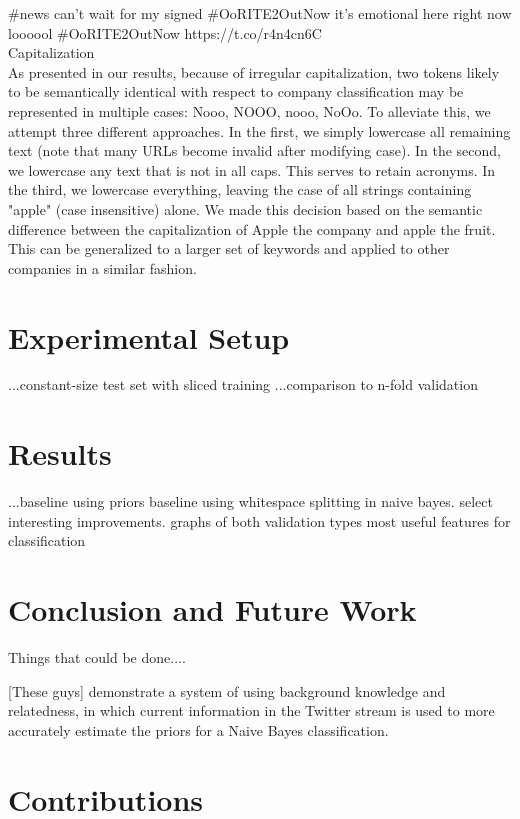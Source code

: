 \documentclass[letterpaper]{article}
\begin{document}
#news can't wait for my signed #OoRITE2OutNow it's emotional here right now loooool #OoRITE2OutNow https://t.co/r4n4cn6C \\

Capitalization\\
As presented in our results, because of irregular capitalization, two tokens likely to be semantically identical with respect to company classification may be represented in multiple cases: {Nooo, NOOO, nooo, NoOo}. To alleviate this, we attempt three different approaches. In the first, we simply lowercase all remaining text (note that many URLs become invalid after modifying case). In the second, we lowercase any text that is not in all caps. This serves to retain acronyms. In the third, we lowercase everything, leaving the case of all strings containing "apple" (case insensitive) alone. We made this decision based on the semantic difference between the capitalization of Apple the company and apple the fruit. This can be generalized to a larger set of keywords and applied to other companies in a similar fashion. 


\section{Experimental Setup}
...constant-size test set with sliced training
...comparison to n-fold validation

\section{Results}
...baseline using priors
  baseline using whitespace splitting in naive bayes.
  select interesting improvements.
  graphs of both validation types
  most useful features for classification

\section{Conclusion and Future Work}

Things that could be done....

[These guys] demonstrate a system of using background knowledge and relatedness, in which current information in the Twitter stream is used to more accurately estimate the priors for a Naive Bayes classification.

\section{Contributions}
\end{document}
